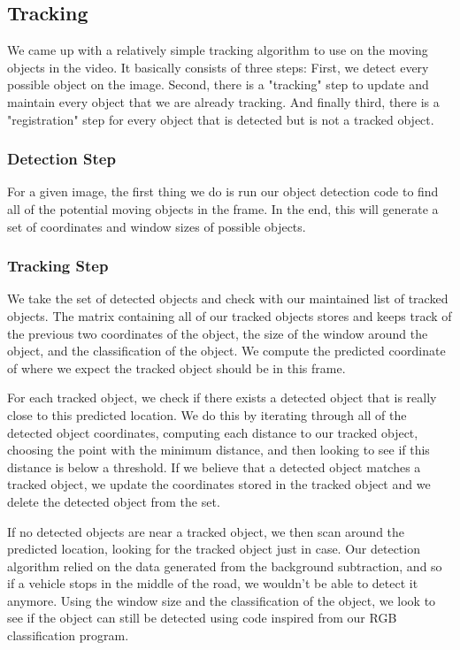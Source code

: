 \documentclass[a4paper, 10pt, conference]{ieeeconf}      %
\begin{document}
\subsection{Tracking}

We came up with a relatively simple tracking algorithm to use on the moving objects in the video. It basically consists of three steps: First, we detect every possible object on the image. Second, there is a "tracking" step to update and maintain every object that we are already tracking. And finally third, there is a "registration" step for every object that is detected but is not a tracked object. 
\newline


\subsubsection{Detection Step}

For a given image, the first thing we do is run our object detection code to find all of the potential moving objects in the frame. In the end, this will generate a set of coordinates and window sizes of possible objects. 
\newline


\subsubsection{Tracking Step}

We take the set of detected objects and check with our maintained list of tracked objects. The matrix containing all of our tracked objects stores and keeps track of the previous two coordinates of the object, the size of the window around the object, and the classification of the object. We compute the predicted coordinate of where we expect the tracked object should be in this frame. \newline

For each tracked object, we check if there exists a detected object that is really close to this predicted location. We do this by iterating through all of the detected object coordinates, computing each distance to our tracked object, choosing the point with the minimum distance, and then looking to see if this distance is below a threshold. If we believe that a detected object matches a tracked object, we update the coordinates stored in the tracked object and we delete the detected object from the set. \newline

If no detected objects are near a tracked object, we then scan around the predicted location, looking for the tracked object just in case. Our detection algorithm relied on the data generated from the background subtraction, and so if a vehicle stops in the middle of the road, we wouldn't be able to detect it anymore. Using the window size and the classification of the object, we look to see if the object can still be detected using code inspired from our RGB classification program. \newline
\end{document}
